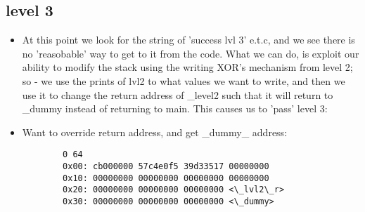\documentclass{article}
\begin{document}
\subsection{level 3}
\begin{itemize}
	    \item At this point we look for the string of 'success lvl 3' e.t.c,
			and we see there is no 'reasobable' way to get to it from the code. What we can do, is exploit
			our ability to modify the stack using the writing XOR's mechanism from level 2; so - we use the prints 
			of lvl2 to what values we want to write, and then we use it to change the return address of \_level2
			such that it will return to \_dummy instead of returning to main. This causes us to 'pass' level 3:

	    \item Want to override return address, and get \_dummy\_ address:
        \begin{small}\begin{verbatim}
        0 64
		0x00: cb000000 57c4e0f5 39d33517 00000000
		0x10: 00000000 00000000 00000000 00000000
		0x20: 00000000 00000000 00000000 <\_lvl2\_r>
		0x30: 00000000 00000000 00000000 <\_dummy>
        \end{verbatim}\end{small}


\end{itemize}
\end{document}
